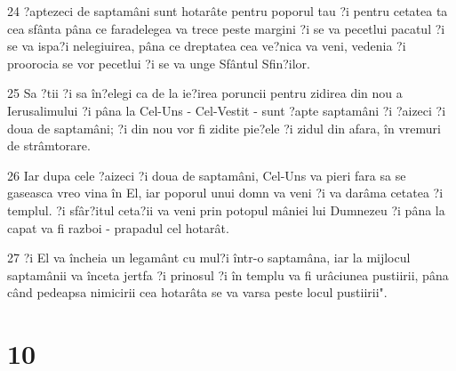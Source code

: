 \par 24 ?aptezeci de saptamâni sunt hotarâte pentru poporul tau ?i pentru cetatea ta cea sfânta pâna ce faradelegea va trece peste margini ?i se va pecetlui pacatul ?i se va ispa?i nelegiuirea, pâna ce dreptatea cea ve?nica va veni, vedenia ?i proorocia se vor pecetlui ?i se va unge Sfântul Sfin?ilor.
\par 25 Sa ?tii ?i sa în?elegi ca de la ie?irea poruncii pentru zidirea din nou a Ierusalimului ?i pâna la Cel-Uns - Cel-Vestit - sunt ?apte saptamâni ?i ?aizeci ?i doua de saptamâni; ?i din nou vor fi zidite pie?ele ?i zidul din afara, în vremuri de strâmtorare.
\par 26 Iar dupa cele ?aizeci ?i doua de saptamâni, Cel-Uns va pieri fara sa se gaseasca vreo vina în El, iar poporul unui domn va veni ?i va darâma cetatea ?i templul. ?i sfâr?itul ceta?ii va veni prin potopul mâniei lui Dumnezeu ?i pâna la capat va fi razboi - prapadul cel hotarât.
\par 27 ?i El va încheia un legamânt cu mul?i într-o saptamâna, iar la mijlocul saptamânii va înceta jertfa ?i prinosul ?i în templu va fi urâciunea pustiirii, pâna când pedeapsa nimicirii cea hotarâta se va varsa peste locul pustiirii".

\chapter{10}

